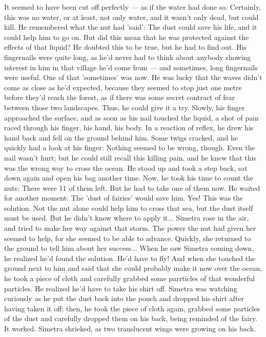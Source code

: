 It seemed to have been cut off perfectly --- as if the water had done so. Certainly, this was no water, or at least, not only water, and it wasn't only dead, but could kill. 
He remembered what the nut had 'said': The dust could save his life, and it could help him to go on. But did this mean that he was protected against the effects of that liquid? He doubted this to be true, but he had to find out. His fingernails were quite long, as he'd never had to think about anybody showing interest in him in that village he'd come from --- and sometimes, long fingernails were useful. One of that 'sometimes' was now. He was lucky that the waves didn't come as close as he'd expected, because they seemed to stop just one metre before they'd reach the forest, as if there was some secret contract of fear between those two landscapes. Thus, he could give it a try. Slowly, his finger approached the surface, and as soon as his nail touched the liquid, a shot of pain raced through his finger, his hand, his body. In a reaction of reflex, he drew his hand back and fell on the ground behind him. Some twigs cracked, and he quickly had a look at his finger: Nothing seemed to be wrong, though. Even the nail wasn't hurt; but he could still recall this killing pain, and he knew that this was the wrong way to cross the ocean. 
He stood up and took a step back, sat down again and open his bag another time. Now, he took his time to count the nuts: There were 11 of them left. 
But he had to take one of them now. He waited for another moment: The 'dust of fairies' would save him. Yes! This was the solution. Not the nut alone could help him to cross that sea, but the dust itself must be used. But he didn't know where to apply it...
Simetra rose in the air, and tried to make her way against that storm. The power the nut had given her seemed to help, for she seemed to be able to advance. Quickly, she returned to the ground to tell him about her success...
When he saw Simetra coming down, he realized he'd found the solution. He'd have to fly! And when she touched the ground next to him and said that she could probably make it now over the ocean, he took a piece of cloth and carefully grabbed some parrticles of that wonderful particles. He realized he'd have to take his shirt off. Simetra was watching curiously as he put the dust back into the pouch and dropped his shirt after having taken it off; then, he took the piece of cloth again, grabbed some particles of the dust and carefully dropped them on his back, being reminded of the fairy. 
It worked. 
Simetra shrieked, as two translucent wings were growing on his back. 
